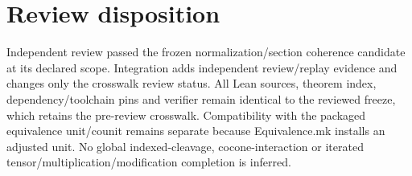 \documentclass{article}
\begin{document}
\section*{Review disposition}
Independent review passed the frozen normalization/section coherence candidate at its declared scope. Integration adds independent review/replay evidence and changes only the crosswalk review status. All Lean sources, theorem index, dependency/toolchain pins and verifier remain identical to the reviewed freeze, which retains the pre-review crosswalk. Compatibility with the packaged equivalence unit/counit remains separate because Equivalence.mk installs an adjusted unit. No global indexed-cleavage, cocone-interaction or iterated tensor/multiplication/modification completion is inferred.
\end{document}
